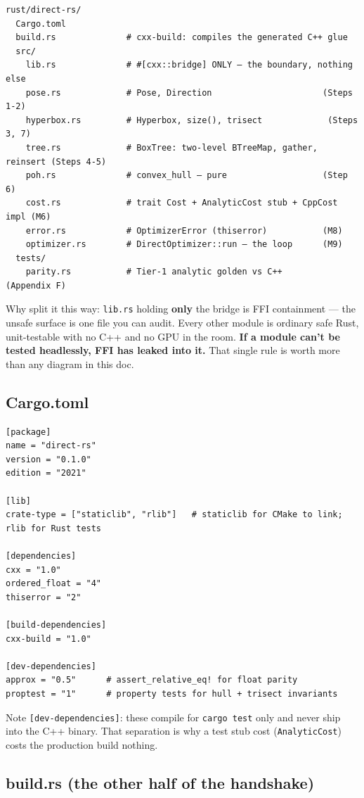 \documentclass[11pt]{article}
\begin{document}
\begin{verbatim}
rust/direct-rs/
  Cargo.toml
  build.rs              # cxx-build: compiles the generated C++ glue
  src/
    lib.rs              # #[cxx::bridge] ONLY — the boundary, nothing else
    pose.rs             # Pose, Direction                      (Steps 1-2)
    hyperbox.rs         # Hyperbox, size(), trisect             (Steps 3, 7)
    tree.rs             # BoxTree: two-level BTreeMap, gather, reinsert (Steps 4-5)
    poh.rs              # convex_hull — pure                   (Step 6)
    cost.rs             # trait Cost + AnalyticCost stub + CppCost impl (M6)
    error.rs            # OptimizerError (thiserror)           (M8)
    optimizer.rs        # DirectOptimizer::run — the loop      (M9)
  tests/
    parity.rs           # Tier-1 analytic golden vs C++        (Appendix F)
\end{verbatim}

Why split it this way: \texttt{lib.rs} holding \textbf{only} the bridge is FFI containment —
the unsafe surface is one file you can audit. Every other module is ordinary
safe Rust, unit-testable with no C++ and no GPU in the room. \textbf{\textbf{If a module
can't be tested headlessly, FFI has leaked into it.}} That single rule is worth
more than any diagram in this doc.
\subsection{Cargo.toml}
\label{sec:org0aa3014}

\begin{verbatim}
[package]
name = "direct-rs"
version = "0.1.0"
edition = "2021"

[lib]
crate-type = ["staticlib", "rlib"]   # staticlib for CMake to link; rlib for Rust tests

[dependencies]
cxx = "1.0"
ordered_float = "4"
thiserror = "2"

[build-dependencies]
cxx-build = "1.0"

[dev-dependencies]
approx = "0.5"      # assert_relative_eq! for float parity
proptest = "1"      # property tests for hull + trisect invariants
\end{verbatim}

Note \texttt{[dev-dependencies]}: these compile for \texttt{cargo test} only and never ship
into the C++ binary. That separation is why a test stub cost (\texttt{AnalyticCost})
costs the production build nothing.
\subsection{build.rs (the other half of the handshake)}
\label{sec:orgf0bdaf7}
\end{document}
